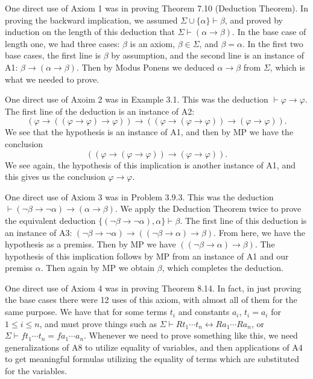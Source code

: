 \documentclass[11pt]{hmcpset}
\newenvironment{problem2}[1]{\noindent {\bf (#1}}
{\medskip}
\begin{document}
\begin{problem2}{b)}

One direct use of Axiom 1 was in proving Theorem 7.10 (Deduction Theorem). In proving the backward implication, we assumed $\Sigma \cup \{\alpha\}\vdash\beta$, and proved by induction on the length of this deduction that $\Sigma\vdash(\alpha\to\beta)$. In the base case of length one, we had three cases: $\beta$ is an axiom, $\beta\in\Sigma$, and $\beta=\alpha$. In the first two base cases, the first line is $\beta$ by assumption, and the second line is an instance of A1: $\beta\to(\alpha\to\beta)$. Then by Modus Ponens we deduced $\alpha\to\beta$ from $\Sigma$, which is what we needed to prove.

One direct use of Axoim 2 was in Example 3.1. This was the deduction $\vdash\varphi\to\varphi$. The first line of the deduction is an instance of A2: $$(\varphi\to((\varphi\to\varphi)\to\varphi))\to((\varphi\to(\varphi\to\varphi))\to(\varphi\to\varphi)).$$ We see that the hypothesis is an instance of A1, and then by MP we have the conclusion $$((\varphi\to(\varphi\to\varphi))\to(\varphi\to\varphi)).$$ We see again, the hypothesis of this implication is another instance of A1, and this gives us the conclusion $\varphi\to\varphi$.

One direct use of Axiom 3 was in Problem 3.9.3. This was the deduction $\vdash(\neg\beta\to\neg\alpha)\to(\alpha\to\beta)$. We apply the Deduction Theorem twice to prove the equivalent deduction $\{(\neg\beta\to\neg\alpha),\alpha\}\vdash\beta$. The first line of this deduction is an instance of A3: $(\neg\beta\to\neg\alpha)\to((\neg\beta\to\alpha)\to\beta)$. From here, we have the hypothesis as a premiss. Then by MP we have $((\neg\beta\to\alpha)\to\beta)$. The hypothesis of this implication follows by MP from an instance of A1 and our premiss $\alpha$. Then again by MP we obtain $\beta$, which completes the deduction.

One direct use of Axiom 4 was in proving Theorem 8.14. In fact, in just proving the base cases there were 12 uses of this axiom, with almost all of them for the same purpose. We have that for some terms $t_i$ and constants $a_i$,  $t_i=a_i$ for $1\le i\le n$, and must prove things such as $\Sigma\vdash Rt_1\cdots t_n\leftrightarrow Ra_1\cdots Ra_n$, or $\Sigma\vdash ft_1\cdots t_n = fa_1\cdots a_n$. Whenever we need to prove something like this, we need generalizations of A8 to utilize equality of variables, and then applications of A4 to get meaningful formulas utilizing the equality of terms which are substituted for the variables.


\end{problem2}
\end{document}

